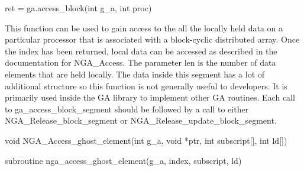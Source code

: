 \documentclass[12pt]{article}
\begin{document}
\begin{pyapi}
\begin{pycode}
ret = ga.access_block(int g_a, int proc)
\end{pycode}
\begin{funcargs}
\end{funcargs}
\end{pyapi}

\local

\begin{desc}

This function can be used to gain access to the all the locally held data on a
particular processor that is associated with a block-cyclic distributed array.
Once the index has been returned, local data can be accessed as described in
the documentation for NGA_Access. The parameter len is the number of data
elements that are held locally. The data inside this segment has a lot of
additional structure so this function is not generally useful to developers. It
is primarily used inside the GA library to implement other GA routines. Each
call to ga_access_block_segment should be followed by a call to either
NGA_Release_block_segment or NGA_Release_update_block_segment.

\end{desc}



\begin{capi}
\begin{ccode}
void NGA_Access_ghost_element(int g_a, void *ptr, int subscript[],
                              int ld[])
\end{ccode}
\begin{funcargs}
\end{funcargs}
\end{capi}

\begin{fapi}
\begin{fcode}
subroutine nga_access_ghost_element(g_a, index, subscript, ld)
\end{fcode}
\begin{funcargs}
\end{funcargs}
\end{fapi}
\end{document}
